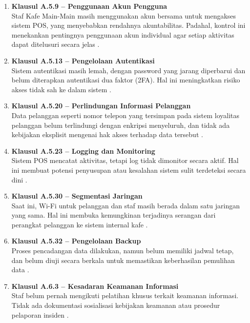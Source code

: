 \documentclass[12pt, a4paper]{report}
\begin{document}
\begin{enumerate}
    \item \textbf{Klausul A.5.9 – Penggunaan Akun Pengguna} \\
    Staf Kafe Main-Main masih menggunakan akun bersama untuk mengakses sistem POS, yang menyebabkan rendahnya akuntabilitas. Padahal, kontrol ini menekankan pentingnya penggunaan akun individual agar setiap aktivitas dapat ditelusuri secara jelas \citep{widodo2022keamanan}.

    \item \textbf{Klausul A.5.13 – Pengelolaan Autentikasi} \\
    Sistem autentikasi masih lemah, dengan password yang jarang diperbarui dan belum diterapkan autentikasi dua faktor (2FA). Hal ini meningkatkan risiko akses tidak sah ke dalam sistem \citep{rijal2022iso}.

    \item \textbf{Klausul A.5.20 – Perlindungan Informasi Pelanggan} \\
    Data pelanggan seperti nomor telepon yang tersimpan pada sistem loyalitas pelanggan belum terlindungi dengan enkripsi menyeluruh, dan tidak ada kebijakan eksplisit mengenai hak akses terhadap data tersebut \citep{ratnasari2021penerapan}.

    \item \textbf{Klausul A.5.23 – Logging dan Monitoring} \\
    Sistem POS mencatat aktivitas, tetapi log tidak dimonitor secara aktif. Hal ini membuat potensi penyusupan atau kesalahan sistem sulit terdeteksi secara dini \citep{sari2023backup}.

    \item \textbf{Klausul A.5.30 – Segmentasi Jaringan} \\
    Saat ini, Wi-Fi untuk pelanggan dan staf masih berada dalam satu jaringan yang sama. Hal ini membuka kemungkinan terjadinya serangan dari perangkat pelanggan ke sistem internal kafe \citep{haryanto2021wifi}.

    \item \textbf{Klausul A.5.32 – Pengelolaan Backup} \\
    Proses pencadangan data dilakukan, namun belum memiliki jadwal tetap, dan belum diuji secara berkala untuk memastikan keberhasilan pemulihan data \citep{sari2023backup}.

    \item \textbf{Klausul A.6.3 – Kesadaran Keamanan Informasi} \\
    Staf belum pernah mengikuti pelatihan khusus terkait keamanan informasi. Tidak ada dokumentasi sosialisasi kebijakan keamanan atau prosedur pelaporan insiden \citep{pratama2022pelatihan}.
\end{enumerate}
\end{document}

